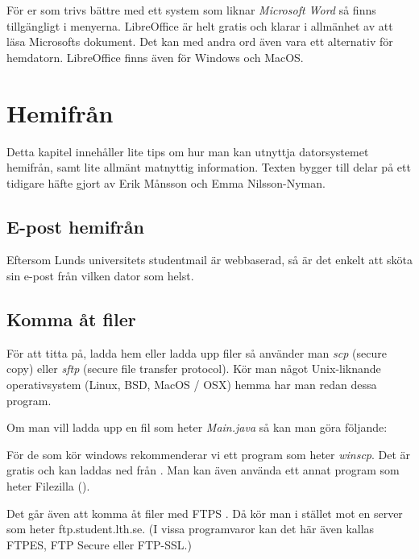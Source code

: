 \documentclass[a4paper,twocolumn]{book}
\begin{document}
För er som trivs bättre med ett system som liknar \emph{Microsoft Word}
så finns  tillgängligt i menyerna. LibreOffice är helt
gratis och klarar i allmänhet av att läsa Microsofts dokument. Det kan med
andra ord även vara ett alternativ för hemdatorn. LibreOffice finns även för
Windows och MacOS.


\chapter{Hemifrån}
\label{cha:hemifran}

Detta kapitel innehåller lite tips om hur man kan utnyttja datorsystemet
hemifrån, samt lite allmänt matnyttig information. Texten bygger till 
delar på ett tidigare häfte gjort av Erik Månsson och Emma Nilsson-Nyman.

\section{E-post hemifrån}

Eftersom Lunds universitets studentmail är webbaserad, så är det enkelt att
sköta sin e-post från vilken dator som helst.


\section{Komma åt filer}

För att titta på, ladda hem eller ladda upp filer så använder man \emph{scp}
(secure copy) eller \emph{sftp} (secure file transfer protocol). Kör man något
Unix-liknande operativsystem (Linux, BSD, MacOS / OSX) hemma har man redan dessa
program. 

Om man vill ladda upp en fil som heter \emph{Main.java} så kan man göra följande:



För de som kör windows rekommenderar vi ett program som heter \emph{winscp}.
Det är gratis och kan laddas ned från . Man kan även
använda ett annat program som heter Filezilla
().

Det går även att komma åt filer med FTPS . Då kör man i stället mot en server
som heter ftp.student.lth.se. (I vissa programvaror kan det här även kallas
FTPES, FTP Secure eller FTP-SSL.)
\end{document}
